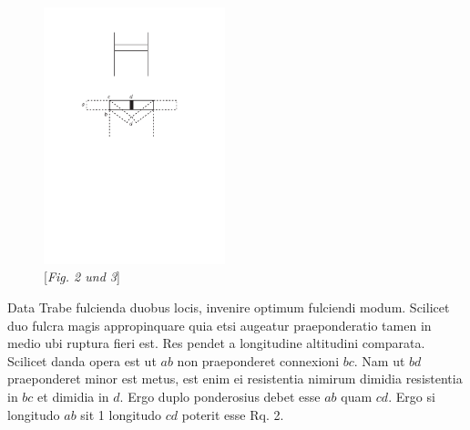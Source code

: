 \begin{figure}
\vspace{-5mm}\centering
\includegraphics[width=0.47\textwidth]{images/lh03705_210r-d2u3.pdf}\\
\centering\hspace{2.5mm}[\textit{Fig. 2 und 3}]
\end{figure}%
Data Trabe\protect{} fulcienda duobus locis, invenire optimum fulciendi modum. Scilicet duo fulcra\protect{} magis appropinquare  quia etsi augeatur praeponderatio tamen in medio ubi ruptura\protect{} fieri   est. Res pendet a longitudine altitudini comparata. Scilicet danda opera est ut $ab$ non praeponderet connexioni $bc$. Nam ut $bd$ praeponderet minor est metus, est enim ei  resistentia\protect{}  nimirum dimidia resistentia\protect{} in $bc$ et dimidia in $d$. Ergo duplo ponderosius debet esse $ab$ quam $cd$. Ergo si longitudo $ab$ sit 1 longitudo $cd$ poterit esse Rq. 2.
\newline%
\hspace*{7,5mm}%
